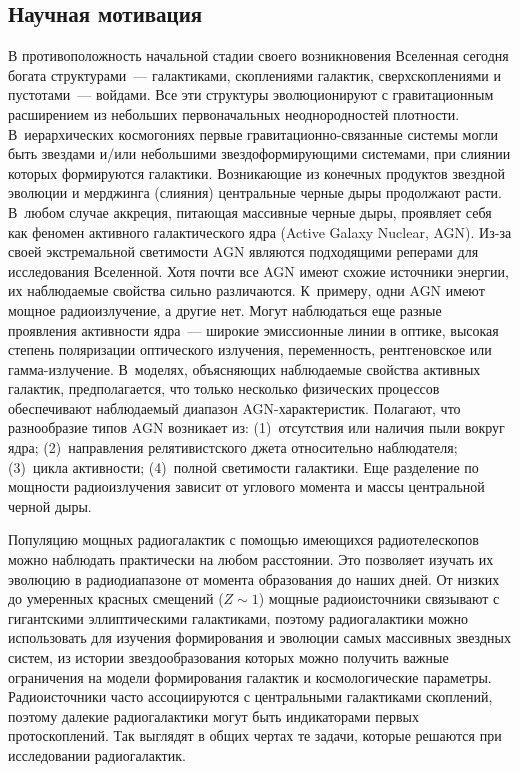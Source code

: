 \begin{multicols}{2}
\subsection{Научная мотивация}

  В противоположность начальной стадии своего возникновения Вселенная сегодня богата 
структурами~--- галактиками, скоплениями галактик, сверхскоплениями и пустотами~--- 
войдами. Все эти структуры эволюционируют с гравитационным расширением из небольших 
первоначальных неоднородностей плотности. В~иерархических космогониях первые 
  гра\-ви\-та\-ци\-он\-но-свя\-зан\-ные сис\-те\-мы могли быть звездами и/или небольшими 
звездоформирующими системами, при слиянии которых формируются галактики. 
Возникающие из конечных продуктов звездной эволюции и мерджинга (слияния) 
центральные черные дыры продолжают расти. В~любом случае аккреция, питающая 
массивные черные дыры, проявляет себя как феномен активного галактического ядра 
({Active Galaxy Nuclear}, AGN). Из-за своей экстремальной светимости AGN 
являются подходящими реперами для исследования Вселенной. Хотя почти все AGN 
име\-ют схожие источники энергии, их наблю\-да\-емые свойства сильно различаются. 
К~примеру, одни AGN имеют мощное радиоизлучение, а другие нет. Могут наблюдаться 
еще разные проявления активности ядра~--- широкие эмиссионные линии в оптике, высокая 
степень поляризации оптического излучения, переменность, рентгеновское или 
  гам\-ма-из\-лу\-че\-ние. В~моделях, объясняющих наблюдаемые свойства активных 
галактик, предполагается, что только несколько физических процессов обеспечивают 
наблюдаемый диапазон AGN-ха\-рак\-те\-ри\-стик. Полагают, что разнообразие типов 
AGN возникает из: (1)~отсутствия или наличия пыли вокруг ядра; (2)~направления 
релятивистского джета относительно наблюдателя; (3)~цикла активности; (4)~полной 
светимости галактики. Еще разделение по мощ\-ности радиоизлучения зависит от углового 
момента и массы центральной черной дыры. 
  
  Популяцию мощных радиогалактик с по\-мощью имеющихся радиотелескопов можно 
наблюдать практически на любом расстоянии. Это позволяет изучать их эволюцию в 
радиодиапазоне от момента образования до наших дней. От низких до умеренных красных 
смещений ($Z\sim1$) мощные радиоисточники связывают с гигантскими эл\-лип\-ти\-че\-ски\-ми 
галактиками, поэтому радиогалактики можно использовать для изучения формирования и 
эволюции самых массивных звездных систем, из истории звездообразования которых можно 
получить важные ограничения на модели формирования галактик и космологические 
параметры. Радиоисточники часто ассоциируются с центральными галактиками скоплений, 
поэтому далекие радиогалактики могут быть индикаторами первых протоскоплений. Так 
выглядят в общих чертах те задачи, которые решаются при исследовании радиогалактик.


\end{multicols}
